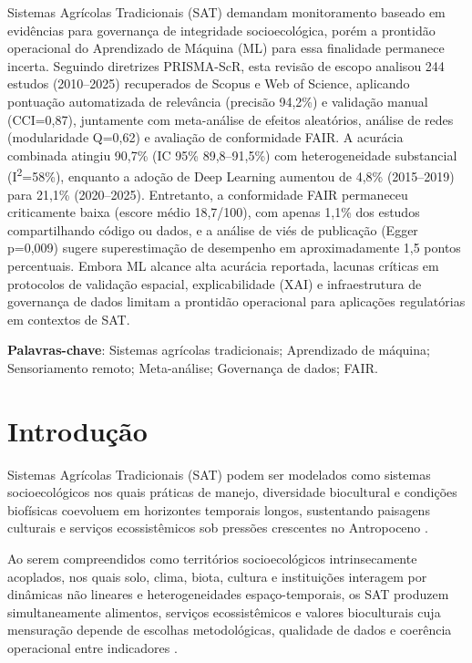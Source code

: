 {\renewcommand{\PRIVATEbookmarkthis}[1]{}%
\begin{resumoumacoluna}
Sistemas Agrícolas Tradicionais (SAT) demandam monitoramento baseado em evidências para governança de integridade socioecológica, porém a prontidão operacional do Aprendizado de Máquina (ML) para essa finalidade permanece incerta. Seguindo diretrizes PRISMA-ScR, esta revisão de escopo analisou 244 estudos (2010--2025) recuperados de Scopus e Web of Science, aplicando pontuação automatizada de relevância (precisão 94,2\%) e validação manual (CCI=0,87), juntamente com meta-análise de efeitos aleatórios, análise de redes (modularidade Q=0,62) e avaliação de conformidade FAIR. A acurácia combinada atingiu 90,7\% (IC 95\% 89,8--91,5\%) com heterogeneidade substancial (I\textsuperscript{2}=58\%), enquanto a adoção de Deep Learning aumentou de 4,8\% (2015--2019) para 21,1\% (2020--2025). Entretanto, a conformidade FAIR permaneceu criticamente baixa (escore médio 18,7/100), com apenas 1,1\% dos estudos compartilhando código ou dados, e a análise de viés de publicação (Egger p=0,009) sugere superestimação de desempenho em aproximadamente 1,5 pontos percentuais. Embora ML alcance alta acurácia reportada, lacunas críticas em protocolos de validação espacial, explicabilidade (XAI) e infraestrutura de governança de dados limitam a prontidão operacional para aplicações regulatórias em contextos de SAT.

\vspace{\onelineskip}
\noindent
\textbf{Palavras-chave}: Sistemas agrícolas tradicionais; Aprendizado de máquina; Sensoriamento remoto; Meta-análise; Governança de dados; FAIR.
\end{resumoumacoluna}}

\newpage

\section[Introdução]{Introdução}

Sistemas Agrícolas Tradicionais (SAT) podem ser modelados como sistemas socioecológicos nos quais práticas de manejo, diversidade biocultural e condições biofísicas coevoluem em horizontes temporais longos, sustentando paisagens culturais e serviços ecossistêmicos sob pressões crescentes no Antropoceno \cite{Berkes2003}. 

Ao serem compreendidos como territórios socioecológicos intrinsecamente acoplados, nos quais solo, clima, biota, cultura e instituições interagem por dinâmicas não lineares e heterogeneidades espaço-temporais, os SAT produzem simultaneamente alimentos, serviços ecossistêmicos e valores bioculturais cuja mensuração depende de escolhas metodológicas, qualidade de dados e coerência operacional entre indicadores \cite{LeFloc2016S}. 

